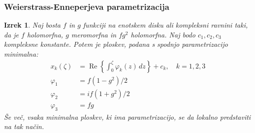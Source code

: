\documentclass[10pt]{beamer}
\theoremstyle{definition}
\theoremstyle{remark}
\theoremstyle{plain}
\newtheorem{izrek}[definicija]{Izrek}
\numberwithin{equation}{section}  %
\begin{document}
\begin{frame}
    \frametitle{Weierstrass-Enneperjeva parametrizacija}

    \begin{izrek}
        Naj bosta $f$ in $g$ funkciji na enotskem disku ali kompleksni ravnini taki, da je $f$ holomorfna, $g$ meromorfna in $f g^2$ holomorfna. Naj bodo $c_1, c_2, c_3$ kompleksne konstante. Potem je ploskev, podana s spodnjo parametrizacijo minimalna:
        $$
        \begin{aligned}
            x_k(\zeta) & =\operatorname{Re}\left\{\int_0^\zeta \varphi_k(z) \, dz\right\}+c_k, \quad k=1,2,3 \\
            \varphi_1 & =f\left(1-g^2\right) / 2 \\
            \varphi_2 & =i f\left(1+g^2\right) / 2 \\
            \varphi_3 & =f g
        \end{aligned}
        $$
        Še več, vsaka minimalna ploskev, ki ima parametrizacijo, se da lokalno predstaviti na tak način.
    \end{izrek}
\end{frame}
\end{document}
